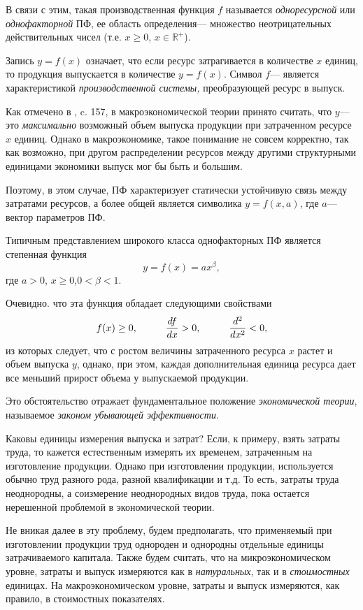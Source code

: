 \documentclass[12pt,openbib]{report}
\begin{document}
В связи с этим, такая производственная функция $f$ называется {\it
одноресурсной} или {\it однофакторной} ПФ, ее область определения---
множество неотрицательных действительных чисел (т.е. $x\ge0$, $x\in
\mathbb{R}^+$).

Запись $y=f(x)$ означает, что если ресурс затрагивается в количестве
$x$ единиц, то продукция выпускается в количестве $y=f(x)$. Символ
$f$--- является характеристикой {\it производственной системы,}
преобразующей ресурс в выпуск.

Как отмечено в \cite{MaslovAksiom}, c. 157, в макроэкономической теории принято
считать, что $y$--- это {\it максимально} возможный объем выпуска
продукции при затраченном ресурсе $x$ единиц. Однако в
макроэкономике, такое понимание не совсем корректно, так как
возможно, при другом распределении ресурсов между другими
структурными единицами экономики выпуск мог бы быть и большим.

Поэтому, в этом случае, ПФ характеризует статически устойчивую связь
между затратами ресурсов, а более общей является символика
$y=f(x,a)$, где $a$--- вектор параметров ПФ.

Типичным представлением широкого класса однофакторных ПФ является
степенная функция
\begin{equation}\label{f12}
y=f(x)=ax^\beta,
\end{equation}
где $a>0$, $x\ge0$,$0<\beta<1$.

Очевидно. что эта функция обладает следующими свойствами
$$f(x)\ge0,\hspace{10mm}\frac{df}{dx}>0,\hspace{10mm}\frac{d^2}{dx^2}<0,$$
из которых следует, что с ростом величины затраченного ресурса $x$
растет и объем выпуска $y$, однако, при этом, каждая дополнительная
единица ресурса дает все меньший прирост объема у выпускаемой
продукции.

Это обстоятельство отражает фундаментальное положение {\it
экономической теории}, называемое {\it законом убывающей
эффективности}.

Каковы единицы измерения выпуска и затрат? Если, к примеру, взять
затраты труда, то кажется естественным измерять их временем,
затраченным на изготовление продукции. Однако при изготовлении
продукции, используется обычно труд разного рода, разной
квалификации и т.д. То есть, затраты труда неоднородны, а
соизмерение неоднородных видов труда, пока остается нерешенной
проблемой в экономической теории.

Не вникая далее в эту проблему, будем предполагать, что применяемый
при изготовлении продукции труд однороден и однородны отдельные
единицы затрачиваемого капитала. Также будем считать, что на
микроэкономическом уровне, затраты и выпуск измеряются как в {\it
натуральных}, так и в {\it стоимостных} единицах. На
макроэкономическом уровне, затраты и выпуск измеряются, как правило,
в стоимостных показателях.
\end{document}
